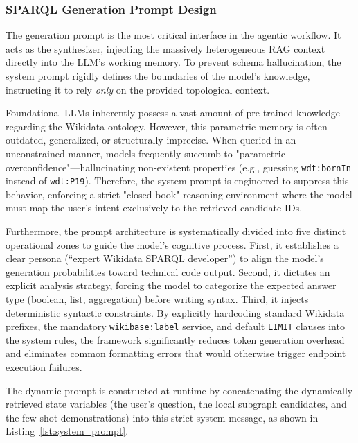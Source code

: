 \subsubsection{SPARQL Generation Prompt Design}
The generation prompt is the most critical interface in the agentic workflow. It acts as the synthesizer, injecting the massively heterogeneous RAG context directly into the LLM's working memory. To prevent schema hallucination, the system prompt rigidly defines the boundaries of the model's knowledge, instructing it to rely \textit{only} on the provided topological context.

Foundational LLMs inherently possess a vast amount of pre-trained knowledge regarding the Wikidata ontology. However, this parametric memory is often outdated, generalized, or structurally imprecise. When queried in an unconstrained manner, models frequently succumb to "parametric overconfidence"—hallucinating non-existent properties (e.g., guessing \texttt{wdt:bornIn} instead of \texttt{wdt:P19}). Therefore, the system prompt is engineered to suppress this behavior, enforcing a strict "closed-book" reasoning environment where the model must map the user's intent exclusively to the retrieved candidate IDs.

Furthermore, the prompt architecture is systematically divided into five distinct operational zones to guide the model's cognitive process. First, it establishes a clear persona (``expert Wikidata SPARQL developer'') to align the model's generation probabilities toward technical code output. Second, it dictates an explicit analysis strategy, forcing the model to categorize the expected answer type (boolean, list, aggregation) before writing syntax. Third, it injects deterministic syntactic constraints. By explicitly hardcoding standard Wikidata prefixes, the mandatory \texttt{wikibase:label} service, and default \texttt{LIMIT} clauses into the system rules, the framework significantly reduces token generation overhead and eliminates common formatting errors that would otherwise trigger endpoint execution failures.

The dynamic prompt is constructed at runtime by concatenating the dynamically retrieved state variables (the user's question, the local subgraph candidates, and the few-shot demonstrations) into this strict system message, as shown in Listing~\ref{lst:system_prompt}.


